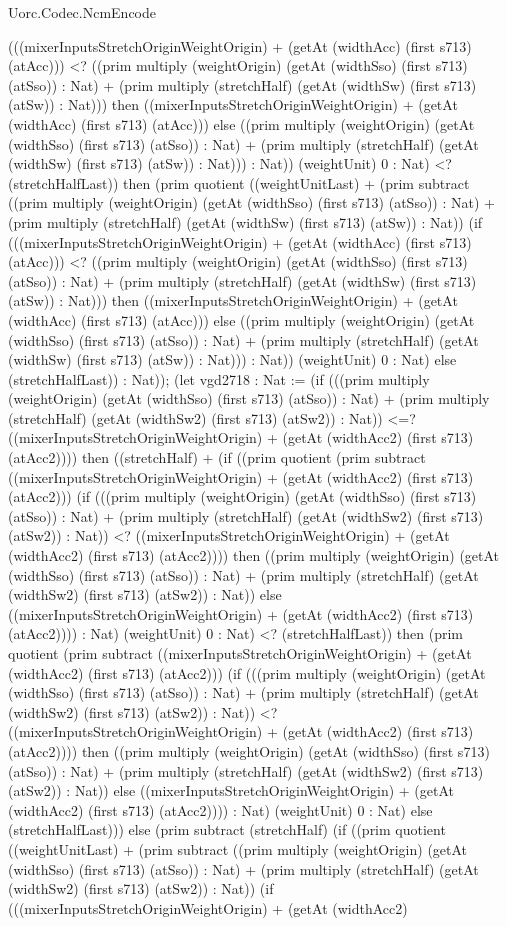 \begin{lexlean}{Uorc.Codec.NcmEncode}
\begin{semanticmodule}
{(((mixerInputsStretchOriginWeightOrigin) + (getAt (widthAcc) (first s713) (atAcc))) <? ((prim multiply (weightOrigin) (getAt (widthSso) (first s713) (atSso)) : Nat) + (prim multiply (stretchHalf) (getAt (widthSw) (first s713) (atSw)) : Nat))) then ((mixerInputsStretchOriginWeightOrigin) + (getAt (widthAcc) (first s713) (atAcc))) else ((prim multiply (weightOrigin) (getAt (widthSso) (first s713) (atSso)) : Nat) + (prim multiply (stretchHalf) (getAt (widthSw) (first s713) (atSw)) : Nat))) : Nat)) (weightUnit) 0 : Nat) <? (stretchHalfLast)) then (prim quotient ((weightUnitLast) + (prim subtract ((prim multiply (weightOrigin) (getAt (widthSso) (first s713) (atSso)) : Nat) + (prim multiply (stretchHalf) (getAt (widthSw) (first s713) (atSw)) : Nat)) (if (((mixerInputsStretchOriginWeightOrigin) + (getAt (widthAcc) (first s713) (atAcc))) <? ((prim multiply (weightOrigin) (getAt (widthSso) (first s713) (atSso)) : Nat) + (prim multiply (stretchHalf) (getAt (widthSw) (first s713) (atSw)) : Nat))) then ((mixerInputsStretchOriginWeightOrigin) + (getAt (widthAcc) (first s713) (atAcc))) else ((prim multiply (weightOrigin) (getAt (widthSso) (first s713) (atSso)) : Nat) + (prim multiply (stretchHalf) (getAt (widthSw) (first s713) (atSw)) : Nat))) : Nat)) (weightUnit) 0 : Nat) else (stretchHalfLast)) : Nat)); (let vgd2718 : Nat := (if (((prim multiply (weightOrigin) (getAt (widthSso) (first s713) (atSso)) : Nat) + (prim multiply (stretchHalf) (getAt (widthSw2) (first s713) (atSw2)) : Nat)) <=? ((mixerInputsStretchOriginWeightOrigin) + (getAt (widthAcc2) (first s713) (atAcc2)))) then ((stretchHalf) + (if ((prim quotient (prim subtract ((mixerInputsStretchOriginWeightOrigin) + (getAt (widthAcc2) (first s713) (atAcc2))) (if (((prim multiply (weightOrigin) (getAt (widthSso) (first s713) (atSso)) : Nat) + (prim multiply (stretchHalf) (getAt (widthSw2) (first s713) (atSw2)) : Nat)) <? ((mixerInputsStretchOriginWeightOrigin) + (getAt (widthAcc2) (first s713) (atAcc2)))) then ((prim multiply (weightOrigin) (getAt (widthSso) (first s713) (atSso)) : Nat) + (prim multiply (stretchHalf) (getAt (widthSw2) (first s713) (atSw2)) : Nat)) else ((mixerInputsStretchOriginWeightOrigin) + (getAt (widthAcc2) (first s713) (atAcc2)))) : Nat) (weightUnit) 0 : Nat) <? (stretchHalfLast)) then (prim quotient (prim subtract ((mixerInputsStretchOriginWeightOrigin) + (getAt (widthAcc2) (first s713) (atAcc2))) (if (((prim multiply (weightOrigin) (getAt (widthSso) (first s713) (atSso)) : Nat) + (prim multiply (stretchHalf) (getAt (widthSw2) (first s713) (atSw2)) : Nat)) <? ((mixerInputsStretchOriginWeightOrigin) + (getAt (widthAcc2) (first s713) (atAcc2)))) then ((prim multiply (weightOrigin) (getAt (widthSso) (first s713) (atSso)) : Nat) + (prim multiply (stretchHalf) (getAt (widthSw2) (first s713) (atSw2)) : Nat)) else ((mixerInputsStretchOriginWeightOrigin) + (getAt (widthAcc2) (first s713) (atAcc2)))) : Nat) (weightUnit) 0 : Nat) else (stretchHalfLast))) else (prim subtract (stretchHalf) (if ((prim quotient ((weightUnitLast) + (prim subtract ((prim multiply (weightOrigin) (getAt (widthSso) (first s713) (atSso)) : Nat) + (prim multiply (stretchHalf) (getAt (widthSw2) (first s713) (atSw2)) : Nat)) (if (((mixerInputsStretchOriginWeightOrigin) + (getAt (widthAcc2) }
\end{semanticmodule}
\end{lexlean}
